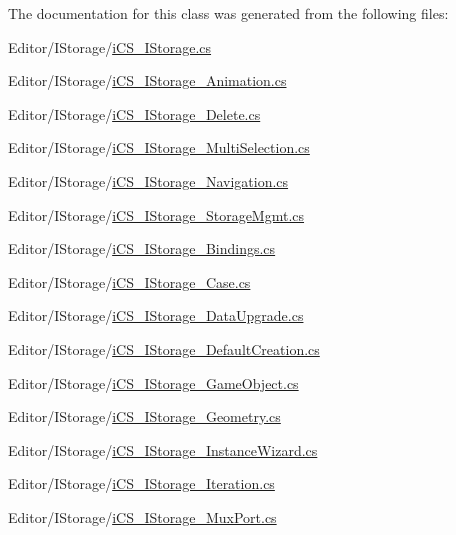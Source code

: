The documentation for this class was generated from the following files\+:\begin{DoxyCompactItemize}
\item 
Editor/\+I\+Storage/\hyperlink{i_c_s___i_storage_8cs}{i\+C\+S\+\_\+\+I\+Storage.\+cs}\item 
Editor/\+I\+Storage/\hyperlink{i_c_s___i_storage___animation_8cs}{i\+C\+S\+\_\+\+I\+Storage\+\_\+\+Animation.\+cs}\item 
Editor/\+I\+Storage/\hyperlink{i_c_s___i_storage___delete_8cs}{i\+C\+S\+\_\+\+I\+Storage\+\_\+\+Delete.\+cs}\item 
Editor/\+I\+Storage/\hyperlink{i_c_s___i_storage___multi_selection_8cs}{i\+C\+S\+\_\+\+I\+Storage\+\_\+\+Multi\+Selection.\+cs}\item 
Editor/\+I\+Storage/\hyperlink{i_c_s___i_storage___navigation_8cs}{i\+C\+S\+\_\+\+I\+Storage\+\_\+\+Navigation.\+cs}\item 
Editor/\+I\+Storage/\hyperlink{i_c_s___i_storage___storage_mgmt_8cs}{i\+C\+S\+\_\+\+I\+Storage\+\_\+\+Storage\+Mgmt.\+cs}\item 
Editor/\+I\+Storage/\hyperlink{i_c_s___i_storage___bindings_8cs}{i\+C\+S\+\_\+\+I\+Storage\+\_\+\+Bindings.\+cs}\item 
Editor/\+I\+Storage/\hyperlink{i_c_s___i_storage___case_8cs}{i\+C\+S\+\_\+\+I\+Storage\+\_\+\+Case.\+cs}\item 
Editor/\+I\+Storage/\hyperlink{i_c_s___i_storage___data_upgrade_8cs}{i\+C\+S\+\_\+\+I\+Storage\+\_\+\+Data\+Upgrade.\+cs}\item 
Editor/\+I\+Storage/\hyperlink{i_c_s___i_storage___default_creation_8cs}{i\+C\+S\+\_\+\+I\+Storage\+\_\+\+Default\+Creation.\+cs}\item 
Editor/\+I\+Storage/\hyperlink{i_c_s___i_storage___game_object_8cs}{i\+C\+S\+\_\+\+I\+Storage\+\_\+\+Game\+Object.\+cs}\item 
Editor/\+I\+Storage/\hyperlink{i_c_s___i_storage___geometry_8cs}{i\+C\+S\+\_\+\+I\+Storage\+\_\+\+Geometry.\+cs}\item 
Editor/\+I\+Storage/\hyperlink{i_c_s___i_storage___instance_wizard_8cs}{i\+C\+S\+\_\+\+I\+Storage\+\_\+\+Instance\+Wizard.\+cs}\item 
Editor/\+I\+Storage/\hyperlink{i_c_s___i_storage___iteration_8cs}{i\+C\+S\+\_\+\+I\+Storage\+\_\+\+Iteration.\+cs}\item 
Editor/\+I\+Storage/\hyperlink{i_c_s___i_storage___mux_port_8cs}{i\+C\+S\+\_\+\+I\+Storage\+\_\+\+Mux\+Port.\+cs}\item 

\end{DoxyCompactItemize}
